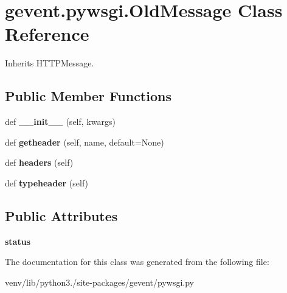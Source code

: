\hypertarget{classgevent_1_1pywsgi_1_1_old_message}{}\section{gevent.\+pywsgi.\+Old\+Message Class Reference}
\label{classgevent_1_1pywsgi_1_1_old_message}


Inherits H\+T\+T\+P\+Message.

\subsection*{Public Member Functions}
\begin{DoxyCompactItemize}
\item 
\mbox{\label{classgevent_1_1pywsgi_1_1_old_message_a5f6b13d0fc440abb8136778ca1295761}} 
def {\bfseries \+\_\+\+\_\+init\+\_\+\+\_\+} (self, kwargs)
\item 
\mbox{\label{classgevent_1_1pywsgi_1_1_old_message_a021fb44210f7a2a5387b5227a50a2c9c}} 
def {\bfseries getheader} (self, name, default=None)
\item 
\mbox{\label{classgevent_1_1pywsgi_1_1_old_message_a4358d1d9aa7ef2f85a27bfae70463c18}} 
def {\bfseries headers} (self)
\item 
\mbox{\label{classgevent_1_1pywsgi_1_1_old_message_aa6dc9b07751eea6442c98892fe5181ec}} 
def {\bfseries typeheader} (self)
\end{DoxyCompactItemize}
\subsection*{Public Attributes}
\begin{DoxyCompactItemize}
\item 
\mbox{\label{classgevent_1_1pywsgi_1_1_old_message_a72fc80bf2a61410a873d4dbc0dd33f7d}} 
{\bfseries status}
\end{DoxyCompactItemize}


The documentation for this class was generated from the following file\+:\begin{DoxyCompactItemize}
\item 
venv/lib/python3./site-\/packages/gevent/pywsgi.\+py\end{DoxyCompactItemize}

